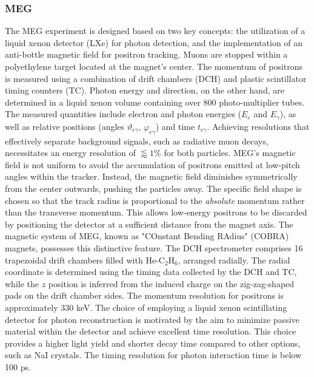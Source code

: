 \begin{refsection}
        \subsubsection{MEG}
        The MEG experiment \cite{MEG} is designed based on two key concepts: the utilization of a liquid xenon detector (LXe) for photon detection, and the implementation of an anti-bottle magnetic field for positron tracking. 
        Muons are stopped within a polyethylene target located at the magnet's center. 
        The momentum of positrons is measured using a combination of drift chambers (DCH) and plastic scintillator timing counters (TC). 
        Photon energy and direction, on the other hand, are determined in a liquid xenon volume containing over 800 photo-multiplier tubes. 
        The measured quantities include electron and photon energies ($E_e$ and $E_\gamma$), as well as relative positions (angles $\vartheta_{e\gamma}$, $\varphi_{e\gamma}$) and time $t_{e\gamma}$. 
        Achieving resolutions that effectively separate background signals, such as radiative muon decays, necessitates an energy resolution of $\lessapprox 1\%$ for both particles.
        \noindent
        MEG's magnetic field is not uniform to avoid the accumulation of positrons emitted at low-pitch angles within the tracker. 
        Instead, the magnetic field diminishes symmetrically from the center outwards, pushing the particles away. 
        The specific field shape is chosen so that the track radius is proportional to the \textit{absolute} momentum rather than the transverse momentum. 
        This allows low-energy positrons to be discarded by positioning the detector at a sufficient distance from the magnet axis. 
        The magnetic system of MEG, known as "COnstant Bending RAdius" (COBRA) magnets, possesses this distinctive feature.
        \noindent
        The DCH spectrometer comprises 16 trapezoidal drift chambers filled with He-C$_2$H$_6$, arranged radially. 
        The radial coordinate is determined using the timing data collected by the DCH and TC, while the $z$ position is inferred from the induced charge on the zig-zag-shaped pads on the drift chamber sides. The momentum resolution for positrons is approximately 330 keV.
        \noindent
        The choice of employing a liquid xenon scintillating detector for photon reconstruction is motivated by the aim to minimize passive material within the detector and achieve excellent time resolution. 
        This choice provides a higher light yield and shorter decay time compared to other options, such as NaI crystals. The timing resolution for photon interaction time is below 100 ps.\\


\end{refsection}
